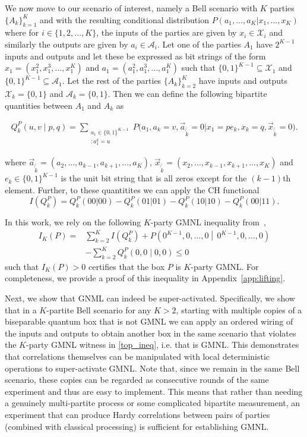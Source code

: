 \documentclass[pra,aps,reprint,superscriptaddress]{revtex4-2}
\theoremstyle{theorem}
\begin{document}
We now move to our scenario of interest, namely a Bell scenario with $K$ parties $\{A_k\}_{k=1}^{K}$ and with the resulting conditional distribution $P(a_1,...,a_K|x_1,...,x_K)$ where for $i\in\{1,2,...,K\}$, the inputs of the parties are given by $x_i\in \mathcal{X}_i$ and similarly the outputs are given by $a_i\in \mathcal{A}_i$. Let one of the parties $A_1$ have $2^{K-1}$ inputs and outputs and let these be expressed as bit strings of the form $x_1=(x_1^2,x_1^3,...,x_1^{K})$ and $a_1=(a_1^2,a_1^3,...,a_1^{K})$ such that $\{0,1\}^{K-1}\subseteq \mathcal{X}_1$ and $\{0,1\}^{K-1}\subseteq \mathcal{A}_1$. Let the rest of the parties $\{A_k\}_{k=2}^{K}$ have inputs and outputs $ \mathcal{X}_k=\{0,1\}$ and $\mathcal{A}_k=\{0,1\} $. Then we can define the following bipartite quantities between $A_1$ and $A_k$ as
\begin{widetext}
\begin{align}
    Q^P_k(u,v\mid p,q)
=
\sum_{\substack{a_1\in\{0,1\}^{K-1}\\ :a_1^k=u}}
P\Big(
a_1, a_k=v, \vec{a}_{\not {k}}=0
 \Big|
x_1=pe_k, x_k=q, \vec{x}_{\not{k}}=0 \Big). \label{marginals}
\end{align}
\end{widetext}
where $\vec{a}_{\not{k}}=(a_2,...,a_{k-1},a_{k+1},...,a_{K})$, $\vec{x}_{\not{k}}=(x_2,...,x_{k-1},x_{k+1},...,x_{K})$ and $e_k\in\{0,1\}^{K-1}$ is the unit bit string that is all zeros except for the $(k-1)$th element. Further, to these quantitites we can apply the CH functional 
\begin{equation}\label{CH_func}
    I(Q^P_k) = Q^P_k(00|00) - Q^P_k(01|01) - Q^P_k(10|10) - Q^P_k(00|11).
\end{equation}

In this work, we rely on the following  $K$-party GMNL inequality from~\cite{Contreras_Tejada_2021}, 
\begin{align}\nonumber
I_K(P)
=&
\sum_{k=2}^{K} I(Q^P_k)
+
P\left(0^{K-1},0,\ldots,0 \middle|\, 0^{K-1},0,\ldots,0\right)
\\& \label{top_ineq} -
\sum_{k=2}^{K} Q^P_k(0,0\mid 0,0)\leq 0 
\end{align}
such that $I_K(P)>0$ certifies that the box $P$ is $K$-party GMNL. For completeness, we provide a proof of this inequality in Appendix~\ref{app:lifting}.

Next, we show that GNML can indeed be super-activated. Specifically, we show that in a $K$-partite  Bell scenario for any $K>2$, starting with multiple copies of a biseparable quantum box that is not GMNL we can apply an ordered wiring of the inputs and outputs to obtain another box in the same scenario that violates the $K$-party GMNL witness in \eqref{top_ineq}, i.e. that is GMNL. This demonstrates that correlations themselves can be manipulated with local deterministic operations to super-activate GMNL. Note that, since we remain in the same Bell scenario, these copies can be regarded as consecutive rounds of the same experiment and thus are easy to implement. This means that rather than needing a genuinely multi-partite process or some complicated bipartite measurement, an experiment that can produce Hardy correlations between pairs of parties (combined with classical processing) is sufficient for establishing GMNL.
\end{document}
